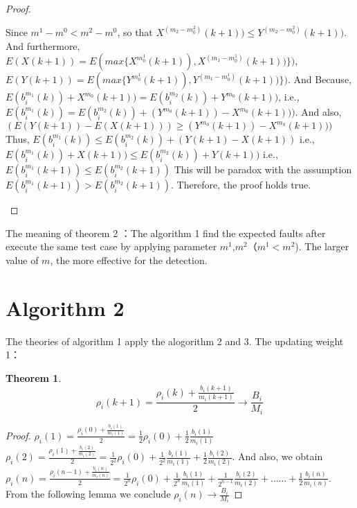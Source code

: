 \documentclass[10pt,journal,letterpaper,compsoc]{IEEEtran}
\newtheorem{thm}{Theorem}[section]
\begin{document}
\begin{CJK}{UTF8}{gkai}
\begin{proof}
\begin{enumerate}
\begin{enumerate}
          Since $m^1-m^0<m^2-m^0$, 
          so that $X^{(m_2-m^2_0)}(k+1)) \leq Y^{(m_2-m^2_0)}(k+1))$. And furthermore, 
           $E(X(k+1)) =E(max \{X^{m^1_0}(k+1)),X^{(m_1-m^1_0)}(k+1))\} )$,
           $E(Y(k+1)) =E(max \{Y^{m^1_0}(k+1)),Y^{(m_1-m^1_0)}(k+1))\} )$. And Because, 
           $E(b_i^{m_1}(k))+X^{m_0}(k+1)) = E(b_i^{m_2}(k))+Y^{m_0}(k+1))$, i.e.,
           $E(b_i^{m_1}(k)) = E(b_i^{m_2}(k))+ (Y^{m_0}(k+1)) - X^{m_0}(k+1)))$.
           And also, 
           $(E(Y(k+1)) - E(X(k+1)))
           \geq (Y^{m_0}(k+1)) - X^{m_0}(k+1)))$
          Thus, $E(b_i^{m_1}(k)) \leq  E(b_i^{m_2}(k))+(Y(k+1) - X(k+1))$
          i.e., $E(b_i^{m_1}(k))+ X(k+1)) \leq E(b_i^{m_2}(k))+Y(k+1))$
          i.e., $ E(b_i^{m_1}(k+1)) \leq E(b_i^{m_2}(k+1))$
          This will be paradox with the assumption  $E(b_i^{m_1}(k+1)) > E(b_i^{m_2}(k+1))$. Therefore, the proof holds true. 
    \end{enumerate}
\end{enumerate}
\end{proof}
The meaning of theorem 2 ：The algorithm 1 find the expected faults after execute the same test case by applying parameter $m^1$,$m^2$（$m^1<m^2$).
The larger value of $m$, the more effective for the detection.

\section{Algorithm 2}
The theories of algorithm 1 apply the alogorithm 2 and 3. 
The updating weight 1：
\begin{thm}
\begin{equation} 
\rho _i(k+1)= \frac{\rho_i(k)+\frac {b_i(k+1)}{m_i(k+1)}}{2} \rightarrow  \frac{B_i}{M_i}
\end{equation}
\end{thm}

\begin{proof}
$\rho_i(1)= \frac{\rho_i(0)+\frac {b_i(1)}{m_i(1)}}{2}
=\frac{1}{2}\rho_i(0)+\frac{1}{2}\frac{b_i(1)}{m_i(1)}$
\\$\rho_i(2)= \frac{\rho_i(1)+\frac {b_i(2)}{m_i(2)}}{2}
=\frac{1}{2^2}\rho_i(0)+\frac{1}{2^2}\frac{b_i(1)}{m_i(1)}
+\frac{1}{2}\frac{b_i(2)}{m_i(2)}$.
And also, we obtain  $\rho_i(n)= \frac{\rho_i(n-1)+\frac {b_i(n)}{m_i(n)}}{2}
=\frac{1}{2^n}\rho_i(0)+\frac{1}{2^n}\frac{b_i(1)}{m_i(1)}
+\frac{1}{2^{n-1}}\frac{b_i(2)}{m_i(2)}+……+\frac{1}{2}\frac{b_i(n)}{m_i(n)}$.
From the following lemma we conclude $\rho_i(n)\rightarrow\frac{B_i}{M_i}$
\end{proof}


\end{CJK}
\end{document}
